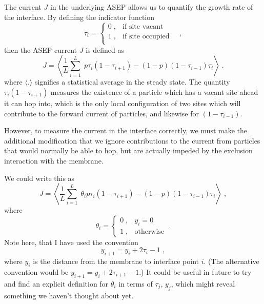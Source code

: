 \documentclass[a4paper,10pt]{article}
\begin{document}
The current $J$ in the underlying ASEP allows us to quantify the growth rate of the interface. By defining the indicator function
\begin{equation}
  \tau_i = \begin{cases}
	      0 \;, & \mbox{if site vacant} \\
              1 \;, & \mbox{if site occupied} \\
           \end{cases} \quad,
\end{equation}
then the ASEP current $J$ is defined as
\begin{equation}
  J = \left \langle \frac{1}{L} \sum_{i=1}^L \; p\tau_i(1-\tau_{i+1})  - (1-p)(1-\tau_{i-1})\tau_i \right\rangle \;.
\end{equation}
where $\langle . \rangle$ signifies a statistical average in the steady state. The quantity $\tau_i(1-\tau_{i+1})$ measures the existence of a particle which has a vacant site ahead it can hop into, which is the only local configuration of two sites which will contribute to the forward current of particles, and likewise for $(1-\tau_{i-1})$. 

However, to measure the current in the interface correctly, we must make the additional modification that we ignore contributions to the current from particles that would normally be able to hop, but are actually impeded by the exclusion interaction with the membrane. 

We could write this as 
\begin{equation}
  J = \left \langle \frac{1}{L} \sum_{i=1}^L \; \theta_{i}p\tau_i(1-\tau_{i+1})  - (1-p)(1-\tau_{i-1})\tau_i \right\rangle \;,
\end{equation}
where
\begin{equation}
  \theta_i = \begin{cases}
               0 \;, & y_i = 0 \\
               1 \;, & \mbox{otherwise}
             \end{cases} \;. 
\end{equation}
Note here, that I have used the convention
\begin{equation}
  y_{i+1} = y_i + 2\tau_i -1 \;,
\end{equation}
where $y_i$ is the distance from the membrane to interface point $i$. (The alternative convention would be $y_{i+1} = y_i + 2\tau_{i+1} -1$.) It could be useful in future to try and find an explicit definition for $\theta_i$ in terms of $\tau_j$, $y_j$, which might reveal something we haven't thought about yet.
\end{document}
